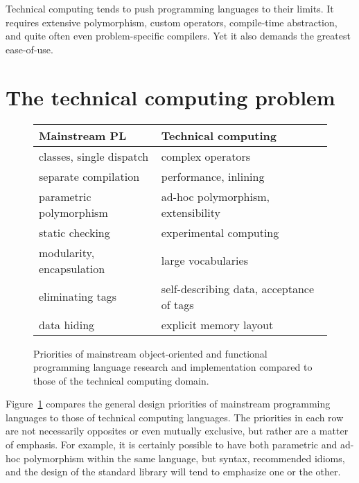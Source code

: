 Technical computing tends to push programming languages to their limits.
It requires extensive polymorphism, custom operators, compile-time
abstraction, and quite often even problem-specific compilers.
Yet it also demands the greatest ease-of-use.



\section{The technical computing problem}

\begin{figure}
  \begin{center}
    \begin{tabular}{|l|l|}\hline
      \textbf{Mainstream PL} & \textbf{Technical computing} \\
      \hline \hline
      classes, single dispatch             &  complex operators \\
      \hline
      separate compilation                 &  performance, inlining \\
      \hline
      parametric polymorphism              &  ad-hoc polymorphism, extensibility \\
      \hline
      static checking                      &  experimental computing \\
      \hline
      modularity, encapsulation            &  large vocabularies \\
      \hline
      eliminating tags                     &  self-describing data, acceptance of tags \\
      \hline
      data hiding                          &  explicit memory layout \\
      \hline
    \end{tabular}
  \end{center}
  \caption{
    Priorities of mainstream object-oriented and functional programming language research and
    implementation compared to those of the technical computing domain.
  }
  \label{PLpriorities}
\end{figure}

Figure~\ref{PLpriorities} compares the general design priorities of mainstream programming
languages to those of technical computing languages. The priorities in each row are not
necessarily opposites or even mutually exclusive, but rather are a matter of emphasis.
For example, it is certainly possible to have both parametric and ad-hoc polymorphism within
the same language, but syntax, recommended idioms, and the design of the standard library will
tend to emphasize one or the other.

